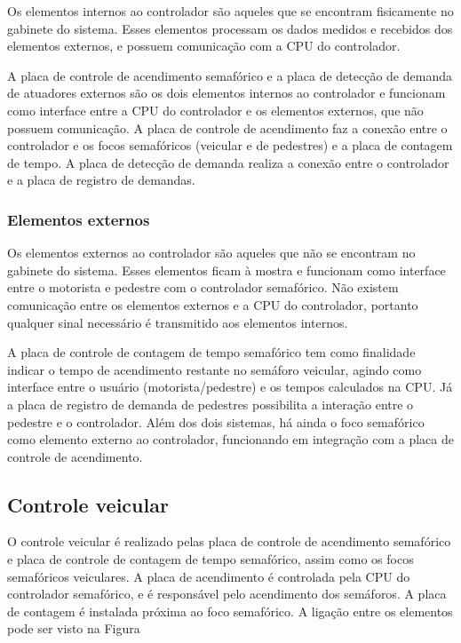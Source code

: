Os elementos internos ao controlador são aqueles que se encontram fisicamente no gabinete do sistema. Esses elementos processam os dados medidos e recebidos dos elementos externos, e possuem comunicação com a \ac{CPU} do controlador.

A placa de controle de acendimento semafórico e a placa de detecção de demanda de atuadores externos são os dois elementos internos ao controlador e funcionam como interface entre a \ac{CPU} do controlador e os elementos externos, que não possuem comunicação.
A placa de controle de acendimento faz a conexão entre o controlador e os focos semafóricos (veicular e de pedestres) e a placa de contagem de tempo. A placa de detecção de demanda realiza a conexão entre o controlador e a placa de registro de demandas.

\subsubsection{Elementos externos}

Os elementos externos ao controlador são aqueles que não se encontram no gabinete do sistema. Esses elementos ficam à mostra e funcionam como interface entre o motorista e pedestre com o controlador semafórico. Não existem comunicação entre os elementos externos e a \ac{CPU} do controlador, portanto qualquer sinal necessário é transmitido aos elementos internos.

A placa de controle de contagem de tempo semafórico tem como finalidade indicar o tempo de acendimento restante no semáforo veicular, agindo como interface entre o usuário (motorista/pedestre) e os tempos calculados na \ac{CPU}. Já a placa de registro de demanda de pedestres possibilita a interação entre o pedestre e o controlador. Além dos dois sistemas, há ainda o foco semafórico como elemento externo ao controlador, funcionando em integração com a placa de controle de acendimento.

\subsection{Controle veicular}

O controle veicular é realizado pelas placa de controle de acendimento semafórico e placa de controle de contagem de tempo semafórico, assim como os focos semafóricos veiculares. A placa de acendimento é controlada pela \ac{CPU} do controlador semafórico, e é responsável pelo acendimento dos semáforos. A placa de contagem é instalada próxima ao foco semafórico. A ligação entre os elementos pode ser visto na Figura


